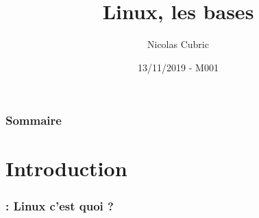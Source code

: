 \documentclass{beamer}
\title{Linux, les bases}
\author{Nicolas Cubric}
\date{13/11/2019 - M001}
\newenvironment{slide}[1]{
  \begin{frame}[environment=slide]
    \frametitle{\textbf{\insertsection}  : #1}}
{\end{frame}}
\begin{document}
\begin{frame}
\maketitle
\end{frame}

\begin{frame}
  \frametitle{Sommaire}
  \tableofcontents
\end{frame}

\section{Introduction}

\begin{slide}{Linux c'est quoi ?}

\end{slide}
\end{document}
